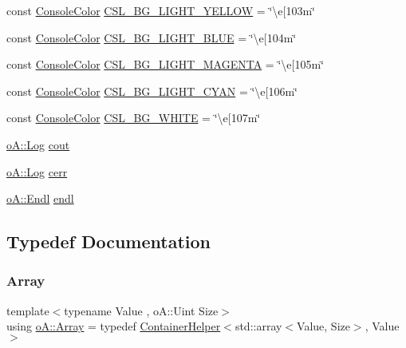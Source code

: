 \begin{DoxyCompactItemize}
\item 
const \mbox{\hyperlink{namespaceo_a_a747e07c1977a29f3e1d38683043ec927}{Console\+Color}} \mbox{\hyperlink{namespaceo_a_a09e8969ce197ec1c1f9037508000d568}{C\+S\+L\+\_\+\+B\+G\+\_\+\+L\+I\+G\+H\+T\+\_\+\+Y\+E\+L\+L\+OW}} = \char`\"{}\textbackslash{}e\mbox{[}103m\char`\"{}
\item 
const \mbox{\hyperlink{namespaceo_a_a747e07c1977a29f3e1d38683043ec927}{Console\+Color}} \mbox{\hyperlink{namespaceo_a_aea34688da59c24d95ef66041e8e313ac}{C\+S\+L\+\_\+\+B\+G\+\_\+\+L\+I\+G\+H\+T\+\_\+\+B\+L\+UE}} = \char`\"{}\textbackslash{}e\mbox{[}104m\char`\"{}
\item 
const \mbox{\hyperlink{namespaceo_a_a747e07c1977a29f3e1d38683043ec927}{Console\+Color}} \mbox{\hyperlink{namespaceo_a_aa2bdb54c1f9bb634105d6ba258ec3c2e}{C\+S\+L\+\_\+\+B\+G\+\_\+\+L\+I\+G\+H\+T\+\_\+\+M\+A\+G\+E\+N\+TA}} = \char`\"{}\textbackslash{}e\mbox{[}105m\char`\"{}
\item 
const \mbox{\hyperlink{namespaceo_a_a747e07c1977a29f3e1d38683043ec927}{Console\+Color}} \mbox{\hyperlink{namespaceo_a_a1a535b11232f764cd1e002846216e003}{C\+S\+L\+\_\+\+B\+G\+\_\+\+L\+I\+G\+H\+T\+\_\+\+C\+Y\+AN}} = \char`\"{}\textbackslash{}e\mbox{[}106m\char`\"{}
\item 
const \mbox{\hyperlink{namespaceo_a_a747e07c1977a29f3e1d38683043ec927}{Console\+Color}} \mbox{\hyperlink{namespaceo_a_ae75b428827d6b26ab62decc5d52a48e5}{C\+S\+L\+\_\+\+B\+G\+\_\+\+W\+H\+I\+TE}} = \char`\"{}\textbackslash{}e\mbox{[}107m\char`\"{}
\item 
\mbox{\hyperlink{classo_a_1_1_log}{o\+A\+::\+Log}} \mbox{\hyperlink{namespaceo_a_ae8c9786d0a7e7a4f39cfe9f820037cb5}{cout}}
\item 
\mbox{\hyperlink{classo_a_1_1_log}{o\+A\+::\+Log}} \mbox{\hyperlink{namespaceo_a_a919fdc84c5697ec40ad5fca7ab642ad9}{cerr}}
\item 
\mbox{\hyperlink{classo_a_1_1_endl}{o\+A\+::\+Endl}} \mbox{\hyperlink{namespaceo_a_a88943cdf20064b5b85e912d200624c49}{endl}}
\end{DoxyCompactItemize}


\subsection{Typedef Documentation}
\mbox{\label{namespaceo_a_a549b65dab9734304711a5195e376afc9}} 
\subsubsection{\texorpdfstring{Array}{Array}}
{\footnotesize\ttfamily template$<$typename Value , o\+A\+::\+Uint Size$>$ \\
using \mbox{\hyperlink{namespaceo_a_a549b65dab9734304711a5195e376afc9}{o\+A\+::\+Array}} = typedef \mbox{\hyperlink{classo_a_1_1_container_helper}{Container\+Helper}}$<$std\+::array$<$Value, Size$>$, Value$>$}



